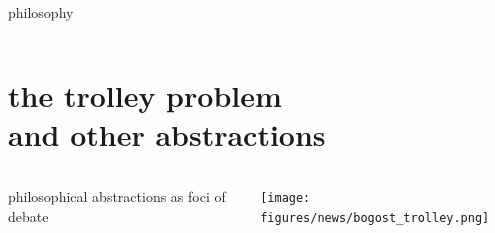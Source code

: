 \documentclass[aspectratio=43,17pt]{beamer} %
\begin{document}
\begin{frame}{philosophy}
\begin{columns}
\begin{column}{0.5\textwidth}




\end{column}
\end{columns}

\end{frame}


\section{the trolley problem\\and other abstractions}


\begin{frame}[plain]
    \begin{columns}
    \begin{column}{0.4\textwidth}
    philosophical abstractions as foci of debate
    \end{column}
    \begin{column}{0.6\textwidth}
    \texttt{[image: figures/news/bogost\_trolley.png]}
    \end{column}
    \end{columns}

\end{frame}
\end{document}
